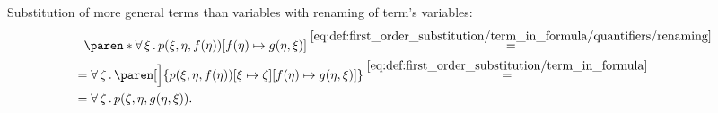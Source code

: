 \begin{example}
\begin{exenum}
     Substitution of more general terms than variables with renaming of term's variables:
    \begin{align*}
      &{}\phantom{=}{}
      \paren*{\qforall{\xi} p(\xi, \eta, f(\eta))}[f(\eta) \mapsto g(\eta, \xi)]
      \overset {\eqref{eq:def:first_order_substitution/term_in_formula/quantifiers/renaming}} = \\ &=
      \qforall{\zeta} \paren[\Big]{p(\xi, \eta, f(\eta))[\xi \mapsto \zeta][f(\eta) \mapsto g(\eta, \xi)]}
      \overset {\eqref{eq:def:first_order_substitution/term_in_formula}} = \\ &=
      \qforall{\zeta} p(\zeta, \eta, g(\eta, \xi)).
    \end{align*}
  \end{exenum}
\end{example}

